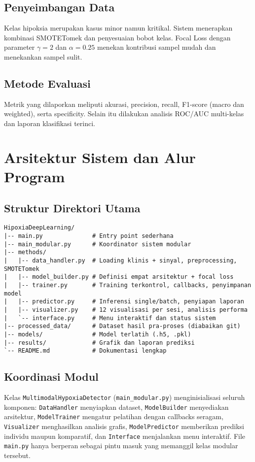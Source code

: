 \documentclass[11pt,a4paper]{article}
\begin{document}
\subsection{Penyeimbangan Data}
Kelas hipoksia merupakan kasus minor namun kritikal. Sistem menerapkan kombinasi SMOTETomek dan penyesuaian bobot kelas. Focal Loss dengan parameter \ensuremath{\gamma=2} dan \ensuremath{\alpha=0.25} menekan kontribusi sampel mudah dan menekankan sampel sulit.
\subsection{Metode Evaluasi}
Metrik yang dilaporkan meliputi akurasi, precision, recall, F1-score (macro dan weighted), serta specificity. Selain itu dilakukan analisis ROC/AUC multi-kelas dan laporan klasifikasi terinci.

\section{Arsitektur Sistem dan Alur Program}
\subsection{Struktur Direktori Utama}
\begin{verbatim}
HipoxiaDeepLearning/
|-- main.py              # Entry point sederhana
|-- main_modular.py      # Koordinator sistem modular
|-- methods/
|   |-- data_handler.py  # Loading klinis + sinyal, preprocessing, SMOTETomek
|   |-- model_builder.py # Definisi empat arsitektur + focal loss
|   |-- trainer.py       # Training terkontrol, callbacks, penyimpanan model
|   |-- predictor.py     # Inferensi single/batch, penyiapan laporan
|   |-- visualizer.py    # 12 visualisasi per sesi, analisis performa
|   `-- interface.py     # Menu interaktif dan status sistem
|-- processed_data/      # Dataset hasil pra-proses (diabaikan git)
|-- models/              # Model terlatih (.h5, .pkl)
|-- results/             # Grafik dan laporan prediksi
`-- README.md            # Dokumentasi lengkap
\end{verbatim}
\subsection{Koordinasi Modul}
Kelas \texttt{MultimodalHypoxiaDetector} (\texttt{main\_modular.py}) menginisialisasi seluruh komponen: \texttt{DataHandler} menyiapkan dataset, \texttt{ModelBuilder} menyediakan arsitektur, \texttt{ModelTrainer} mengatur pelatihan dengan callbacks seragam, \texttt{Visualizer} menghasilkan analisis grafis, \texttt{ModelPredictor} memberikan prediksi individu maupun komparatif, dan \texttt{Interface} menjalankan menu interaktif. File \texttt{main.py} hanya berperan sebagai pintu masuk yang memanggil kelas modular tersebut.
\end{document}
